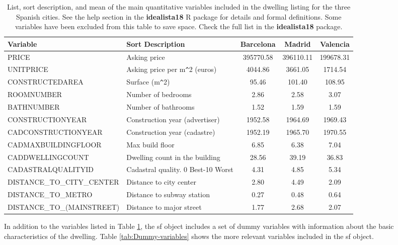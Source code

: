 \documentclass[Royal,times,sageh]{sagej}
\begin{document}
\begin{table}[ht]
\centering
\fontsize{8}{10}\selectfont
\begin{tabular}{>{\raggedright\arraybackslash}p{13em}>{\raggedright\arraybackslash}p{14em}ccc}
  \hline
Variable & Sort Description & Barcelona & Madrid & Valencia \\ 
  \hline
PRICE & Asking price & 395770.58 & 396110.11 & 199678.31 \\ 
  UNITPRICE & Asking price per m\verb|^|2 (euros) & 4044.86 & 3661.05 & 1714.54 \\ 
  CONSTRUCTEDAREA & Surface (m\verb|^|2) & 95.46 & 101.40 & 108.95 \\ 
  ROOMNUMBER & Number of bedrooms & 2.86 & 2.58 & 3.07 \\ 
  BATHNUMBER & Number of bathrooms & 1.52 & 1.59 & 1.59 \\ 
  CONSTRUCTIONYEAR & Construction year (advertiser) & 1952.58 & 1964.69 & 1969.43 \\ 
  CADCONSTRUCTIONYEAR & Construction year (cadastre) & 1952.19 & 1965.70 & 1970.55 \\ 
  CADMAXBUILDINGFLOOR & Max build floor & 6.85 & 6.38 & 7.04 \\ 
  CADDWELLINGCOUNT & Dwelling count in the building & 28.56 & 39.19 & 36.83 \\ 
  CADASTRALQUALITYID & Cadastral quality. 0 Best-10 Worst & 4.31 & 4.85 & 5.34 \\ 
  DISTANCE\_TO\_CITY\_CENTER & Distance to city center & 2.80 & 4.49 & 2.09 \\ 
  DISTANCE\_TO\_METRO & Distance to subway station & 0.27 & 0.48 & 0.64 \\ 
  DISTANCE\_TO\_(MAINSTREET) & Distance to major street & 1.77 & 2.68 & 2.07 \\ 
   \hline
\end{tabular}
\caption{List, sort description, and mean of the main quantitative variables included in the dwelling listing for the three Spanish cities. See the help section in the \textbf{idealista18} R package for details and formal definitions. Some variables have been excluded from this table to save space. Check the full list in the \textbf{idealista18} package.\label{tab:variables}} 
\end{table}

In addition to the variables listed in Table \ref{tab:variables}, the sf
object includes a set of dummy variables with information about the
basic characteristics of the dwelling. Table \ref{tab:Dummy-variables}
shows the more relevant variables included in the sf object.
\end{document}
